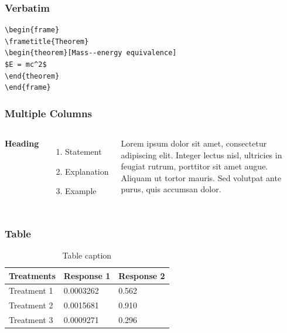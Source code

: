\documentclass[10pt]{beamer}
\begin{document}
\begin{frame}[fragile] %
\frametitle{Verbatim}
\begin{example}
\begin{verbatim}
\begin{frame}
\frametitle{Theorem}
\begin{theorem}[Mass--energy equivalence]
$E = mc^2$
\end{theorem}
\end{frame}\end{verbatim}
\end{example}
\end{frame}

\begin{frame}
\frametitle{Multiple Columns}
\begin{columns}[c] %

\textbf{Heading}
\begin{enumerate}
\item Statement
\item Explanation
\item Example
\end{enumerate}

Lorem ipsum dolor sit amet, consectetur adipiscing elit. Integer lectus nisl, ultricies in feugiat rutrum, porttitor sit amet augue. Aliquam ut tortor mauris. Sed volutpat ante purus, quis accumsan dolor.

\end{columns}
\end{frame}

\begin{frame}
\frametitle{Table}
\begin{table}
\begin{tabular}{l l l}
\toprule
\textbf{Treatments} & \textbf{Response 1} & \textbf{Response 2}\\
\midrule
Treatment 1 & 0.0003262 & 0.562 \\
Treatment 2 & 0.0015681 & 0.910 \\
Treatment 3 & 0.0009271 & 0.296 \\
\bottomrule
\end{tabular}
\caption{Table caption}
\end{table}
\end{frame}
\end{document}
